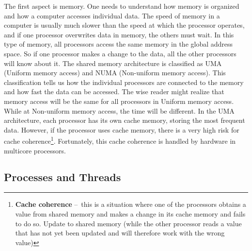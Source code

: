 The first aspect is memory. One needs to understand how memory is organized and how a computer accesses individual data. The speed of memory in a computer is usually much slower than the speed at which the processor operates, and if one processor overwrites data in memory, the others must wait. In this type of memory, all processors access the same memory in the global address space. So if one processor makes a change to the data, all the other processors will know about it. The shared memory architecture is classified as UMA (Uniform memory access) and NUMA (Non-uniform memory access). This classification tells us how the individual processors are connected to the memory and how fast the data can be accessed. The wise reader might realize that memory access will be the same for all processors in Uniform memory access. While at Non-uniform memory access, the time will be different. In the UMA architecture, each processor has its own cache memory, storing the most frequent data. However, if the processor uses cache memory, there is a very high risk for cache coherence\footnote {\textbf{Cache coherence} \---\ this is a situation where one of the processors obtains a value from shared memory and makes a change in its cache memory and fails to do so. Update to shared memory (while the other processor reads a value that has not yet been updated and will therefore work with the wrong value)}. Fortunately, this cache coherence is handled by hardware in multicore processors.

\subsection{Processes and Threads}

